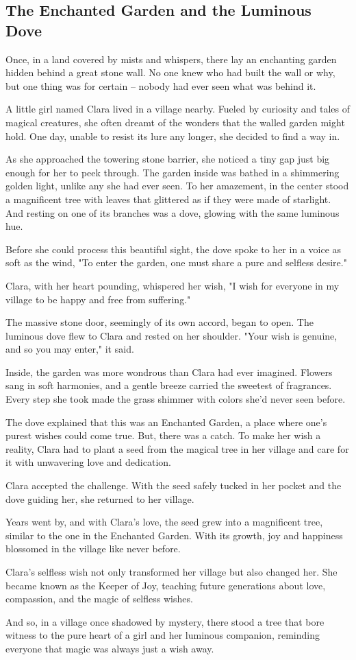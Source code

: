 \documentclass[10pt, a4paper, titlepage]{article}
\begin{document}
\subsection{The Enchanted Garden and the Luminous Dove}

Once, in a land covered by mists and whispers, there lay an enchanting garden hidden behind a great stone wall. No one knew who had built the wall or why, but one thing was for certain – nobody had ever seen what was behind it.

A little girl named Clara lived in a village nearby. Fueled by curiosity and tales of magical creatures, she often dreamt of the wonders that the walled garden might hold. One day, unable to resist its lure any longer, she decided to find a way in.

As she approached the towering stone barrier, she noticed a tiny gap just big enough for her to peek through. The garden inside was bathed in a shimmering golden light, unlike any she had ever seen. To her amazement, in the center stood a magnificent tree with leaves that glittered as if they were made of starlight. And resting on one of its branches was a dove, glowing with the same luminous hue.

Before she could process this beautiful sight, the dove spoke to her in a voice as soft as the wind, "To enter the garden, one must share a pure and selfless desire."

Clara, with her heart pounding, whispered her wish, "I wish for everyone in my village to be happy and free from suffering."

The massive stone door, seemingly of its own accord, began to open. The luminous dove flew to Clara and rested on her shoulder. "Your wish is genuine, and so you may enter," it said.

Inside, the garden was more wondrous than Clara had ever imagined. Flowers sang in soft harmonies, and a gentle breeze carried the sweetest of fragrances. Every step she took made the grass shimmer with colors she'd never seen before.

The dove explained that this was an Enchanted Garden, a place where one’s purest wishes could come true. But, there was a catch. To make her wish a reality, Clara had to plant a seed from the magical tree in her village and care for it with unwavering love and dedication.

Clara accepted the challenge. With the seed safely tucked in her pocket and the dove guiding her, she returned to her village.

Years went by, and with Clara's love, the seed grew into a magnificent tree, similar to the one in the Enchanted Garden. With its growth, joy and happiness blossomed in the village like never before.

Clara's selfless wish not only transformed her village but also changed her. She became known as the Keeper of Joy, teaching future generations about love, compassion, and the magic of selfless wishes.

And so, in a village once shadowed by mystery, there stood a tree that bore witness to the pure heart of a girl and her luminous companion, reminding everyone that magic was always just a wish away.
\end{document}
